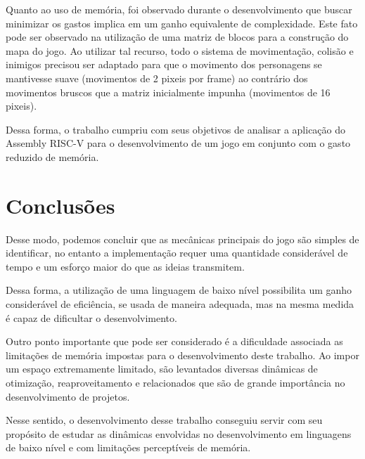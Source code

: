 \documentclass[11pt, twocolumn]{extarticle}
\begin{document}
Quanto ao uso de memória, foi observado durante o desenvolvimento que buscar minimizar os gastos implica em um ganho equivalente de complexidade. Este fato pode ser observado na utilização de uma matriz de blocos para a construção do mapa do jogo. Ao utilizar tal recurso, todo o sistema de movimentação, colisão e inimigos precisou ser adaptado para que o movimento dos personagens se mantivesse suave (movimentos de 2 pixeis por frame) ao contrário dos movimentos bruscos que a matriz inicialmente impunha (movimentos de 16 pixeis).

Dessa forma, o trabalho cumpriu com seus objetivos de analisar a aplicação do Assembly RISC-V para o desenvolvimento de um jogo em conjunto com o gasto reduzido de memória. 

\section{Conclusões}
\indent \indent Desse modo, podemos concluir que as mecânicas principais do jogo são simples de identificar, no entanto a implementação requer uma quantidade considerável de tempo e um esforço maior do que as ideias transmitem.

Dessa forma, a utilização de uma linguagem de baixo nível possibilita um ganho considerável de eficiência, se usada de maneira adequada, mas na mesma medida é capaz de dificultar o desenvolvimento. 

Outro ponto importante que pode ser considerado é a dificuldade associada as limitações de memória impostas para o desenvolvimento deste trabalho. Ao impor um espaço extremamente limitado, são levantados diversas dinâmicas de otimização, reaproveitamento e relacionados que são de grande importância no desenvolvimento de projetos. 

Nesse sentido, o desenvolvimento desse trabalho conseguiu servir com seu propósito de estudar as dinâmicas envolvidas no desenvolvimento em linguagens de baixo nível e com limitações perceptíveis de memória.

\begin{thebibliography}{3}
\end{thebibliography}
		
\end{document}
